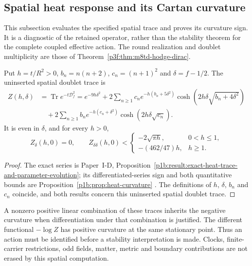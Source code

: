 \documentclass[11pt,a4paper]{article}
\begin{document}
\subsection{Spatial heat response and its Cartan curvature}
\label{p3f:app:m8td-heat}
This subsection evaluates the specified spatial trace and proves its
curvature sign. It is a diagnostic of the retained operator, rather than
the stability theorem for the complete coupled effective action. The
round realization and doublet multiplicity are those of
Theorem~\ref{p3f:thm:m8td-hodge-dirac}.

\begin{proposition}
\label{p3f:prop:m8td-heat-curvature}
Put $h=t/R^2>0$, $b_n=n(n+2)$, $c_n=(n+1)^2$ and $\delta=f-1/2$.
The uninserted spatial doublet trace is
\begin{align}
 Z(h,\delta)&=\operatorname{Tr}e^{-t\mathcal D_f^2}
 =e^{-9h\delta^2}
 +2\sum_{n\ge1}c_ne^{-h(b_n+5\delta^2)}
       \cosh(2h\delta\sqrt{b_n+4\delta^2})\nonumber\\
 &\quad+2\sum_{n\ge1}b_ne^{-h(c_n+\delta^2)}
       \cosh(2h\delta\sqrt{c_n}).
 \label{p3f:eq:m8td-heat-trace}
\end{align}
It is even in $\delta$, and for every $h>0$,
\begin{equation}
 Z_\delta(h,0)=0,\qquad
 Z_{\delta\delta}(h,0)<
 \begin{cases}-2\sqrt{\pi h},&0<h\le1,\\
 -(462/47)h,&h\ge1.
 \end{cases}
 \label{p3f:eq:m8td-heat-curvature}
\end{equation}
\end{proposition}
\begin{proof}
The exact series is Paper~I-D,
Proposition~\ref{p1b:result:exact-heat-trace-and-parameter-evolution};
its differentiated-series sign and both quantitative bounds are
Proposition~\ref{p1b:prop:heat-curvature}
\cite{Kugelmann2026Paper1D}. The definitions of \(h\), \(\delta\),
\(b_n\) and \(c_n\) coincide, and both results concern this uninserted
spatial doublet trace.
\end{proof}

A nonzero positive linear combination of these traces inherits the
negative curvature when differentiation under that combination is
justified. The different functional $-\log Z$ has positive curvature at
the same stationary point. Thus an action must be identified before a
stability interpretation is made. Clocks, finite-carrier restrictions,
odd fields, matter, metric and boundary contributions are not erased by
this spatial computation.
\end{document}
